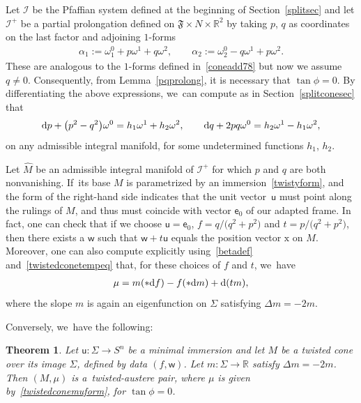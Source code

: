 \documentclass[pdftex]{sigma}
\def\R{\mathbb{R}}
\def\ve{\mathsf{e}}
\def\vx{\boldsymbol{\mathrm{x}}}
\def\vw{\mathsf{w}}
\def\vu{\mathsf{u}}
\def\F{\mathfrak{F}}
\def\calI{\mathcal{I}}
\def\w{\omega}
\def\Mhat{\widehat{M}}
\newtheorem{Theorem}{Theorem}[section]
\numberwithin{equation}{section}
\begin{document}
Let $\calI$ be the Pfaffian system defined at the beginning of Section~\ref{splitsec} and let $\calI^+$ be a partial prolongation defined on $\F \times N \times \R^2$ by taking $p$, $q$ as coordinates on the last factor and adjoining $1$-forms
\begin{gather*}
\alpha_1 := \w^0_1 + p \w^1 + q\w^2 , \qquad \alpha_2 := \w^0_2 -q\w^1+ p\w^2.
\end{gather*}
These are analogous to the $1$-forms defined in~\eqref{coneadd78} but now we assume $q\ne 0$. Consequently, from Lemma~\ref{pqprolong}, it is necessary that $\tan\phi=0$. By differentiating the above expressions, we~can compute as in Section~\ref{splitconesec} that
\begin{gather} \label{twistedconetempeq}
{\rm d}p + \big(p^2 - q^2\big) \w^0 = h_1 \w^1 + h_2 \w^2, \qquad
{\rm d}q + 2pq \w^0 = h_2 \w^1 - h_1 \w^2,
\end{gather}
on any admissible integral manifold, for some undetermined functions $h_1$, $h_2$.

Let $\Mhat$ be an admissible integral manifold of $\calI^+$ for which $p$ and $q$ are both nonvanishing. If~its base $M$ is parametrized by an immersion~\eqref{twistyform}, and the form of the right-hand side indicates that the unit vector~$\vu$ must point along the rulings of $M$, and thus must coincide with vector $\ve_0$ of our adapted frame. In fact, one can check that if we choose $\vu= \ve_0$, $f=q/\big(q^2+p^2\big)$ and $t=p/\big(q^2+p^2\big)$, then there exists a $\vw$ such that $\vw + t \vu$ equals the position vector $\vx$ on $M$. Moreover, one can also compute explicitly using~\eqref{betadef} and~\eqref{twistedconetempeq} that, for these choices of $f$ and $t$, we~have
\begin{gather} \label{twistedconemuform}
\mu = m (*{\rm d}f) - f (*{\rm d}m) + {\rm d}(tm),
\end{gather}
where the slope $m$ is again an eigenfunction on $\Sigma$ satisfying $\Delta m = -2m$.

Conversely, we~have the following:
\begin{Theorem}
Let $\vu\colon\Sigma \to S^n$ be a minimal immersion and let $M$ be a twisted
cone over its image $\Sigma$, defined by data $(f,\vw)$. Let $m\colon\Sigma \to \R$ satisfy
$\Delta m =-2m$. Then $(M,\mu)$ is a~twi\-s\-ted-austere pair, where $\mu$ is given by~\eqref{twistedconemuform}, for $\tan\phi=0$.
\end{Theorem}
\end{document}
